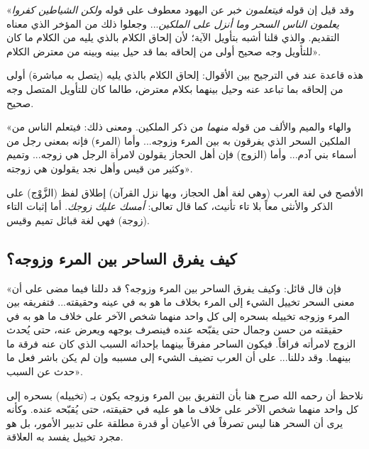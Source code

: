  «وقد قيل إن قوله \textit{فيتعلمون} خبر عن اليهود معطوف على قوله \textit{ولكن الشياطين كفروا يعلمون الناس السحر وما أنزل على الملكين}... وجعلوا ذلك من المؤخر الذي معناه التقديم. والذي قلنا أشبه بتأويل الآية؛ لأن إلحاق الكلام بالذي يليه من الكلام ما كان للتأويل وجه صحيح أولى من إلحاقه بما قد حيل بينه وبينه من معترض الكلام».

\begin{fawaid}
هذه قاعدة عند  في الترجيح بين الأقوال: إلحاق الكلام بالذي يليه (يتصل به مباشرة) أولى من إلحاقه بما تباعد عنه وحيل بينهما بكلام معترض، طالما كان للتأويل المتصل وجه صحيح.
\end{fawaid}

 «والهاء والميم والألف من قوله \textit{منهما} من ذكر الملكين. ومعنى ذلك: فيتعلم الناس من الملكين السحر الذي يفرقون به بين المرء وزوجه... وأما (المرء) فإنه بمعنى رجل من أسماء بني آدم... وأما (الزوج) فإن أهل الحجاز يقولون لامرأة الرجل هي زوجه... وتميم وكثير من قيس وأهل نجد يقولون هي زوجته».

\begin{fawaid}
الأفصح في لغة العرب (وهي لغة أهل الحجاز، وبها نزل القرآن) إطلاق لفظ (الزَّوْج) على الذكر والأنثى معاً بلا تاء تأنيث، كما قال تعالى: \textit{أمسك عليك زوجك}. أما إثبات التاء (زوجة) فهي لغة قبائل تميم وقيس.
\end{fawaid}

\subsection{كيف يفرق الساحر بين المرء وزوجه؟}
 «فإن قال قائل: وكيف يفرق الساحر بين المرء وزوجه؟ قد دللنا فيما مضى على أن معنى السحر تخييل الشيء إلى المرء بخلاف ما هو به في عينه وحقيقته... فتفريقه بين المرء وزوجه تخييله بسحره إلى كل واحد منهما شخص الآخر على خلاف ما هو به في حقيقته من حسن وجمال حتى يقبّحه عنده فينصرف بوجهه ويعرض عنه، حتى يُحدث الزوج لامرأته فراقاً. فيكون الساحر مفرقاً بينهما بإحداثه السبب الذي كان عنه فرقة ما بينهما. وقد دللنا... على أن العرب تضيف الشيء إلى مسببه وإن لم يكن باشر فعل ما حدث عن السبب».

\begin{fawaid}
نلاحظ أن  رحمه الله صرح هنا بأن التفريق بين المرء وزوجه يكون بـ (تخييله) بسحره إلى كل واحد منهما شخص الآخر على خلاف ما هو عليه في حقيقته، حتى يُقبّحه عنده. وكأنه يرى أن السحر هنا ليس تصرفاً في الأعيان أو قدرة مطلقة على تدبير الأمور، بل هو مجرد تخييل يفسد به العلاقة.
\end{fawaid}

